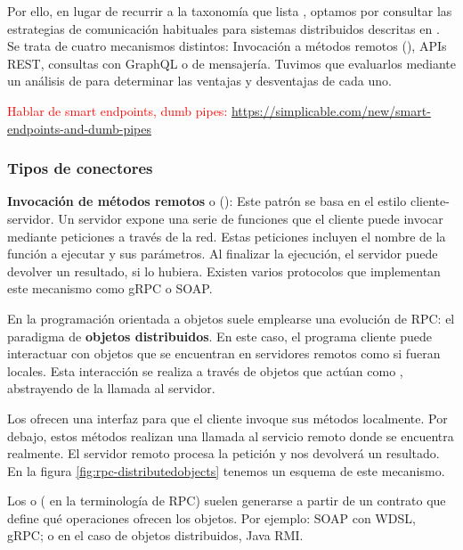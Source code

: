 Por ello, en lugar de recurrir a la taxonomía que lista \cite{mehtaTaxonomySoftwareConnectors2000}, optamos por consultar las estrategias de comunicación habituales para sistemas distribuidos descritas en \cite{newmanBuildingMicroservicesDesigning2021}. Se trata de cuatro mecanismos distintos: Invocación a métodos remotos (), APIs REST, consultas con GraphQL o  de mensajería. Tuvimos que evaluarlos mediante un análisis de  para determinar las ventajas y desventajas de cada uno.

\textcolor{red}{Hablar de smart endpoints, dumb pipes: \url{https://simplicable.com/new/smart-endpoints-and-dumb-pipes}}

\subsubsection{Tipos de conectores}

\textbf{Invocación de métodos remotos} o (): Este patrón se basa en el estilo cliente-servidor. Un servidor expone una serie de funciones que el cliente puede invocar mediante peticiones a través de la red. Estas peticiones incluyen el nombre de la función a ejecutar y sus parámetros. Al finalizar la ejecución, el servidor puede devolver un resultado, si lo hubiera. Existen varios protocolos que implementan este mecanismo como gRPC o SOAP.

En la programación orientada a objetos suele emplearse una evolución de RPC: el paradigma de \textbf{objetos distribuidos}. \cite{tanenbaumChapter10Distributed2007} En este caso, el programa cliente puede interactuar con objetos que se encuentran en servidores remotos como si fueran locales. Esta interacción se realiza a través de objetos que actúan como , abstrayendo de la llamada al servidor.

Los  ofrecen una interfaz para que el cliente invoque sus métodos localmente. Por debajo, estos métodos realizan una llamada al servicio remoto donde se encuentra realmente. El servidor remoto procesa la petición y nos devolverá un resultado. En la figura \ref{fig:rpc-distributedobjects} tenemos un esquema de este mecanismo.

Los  o ( en la terminología de RPC) suelen generarse a partir de un contrato que define qué operaciones ofrecen los objetos. Por ejemplo: SOAP con WDSL, gRPC; o en el caso de objetos distribuidos, Java RMI.

